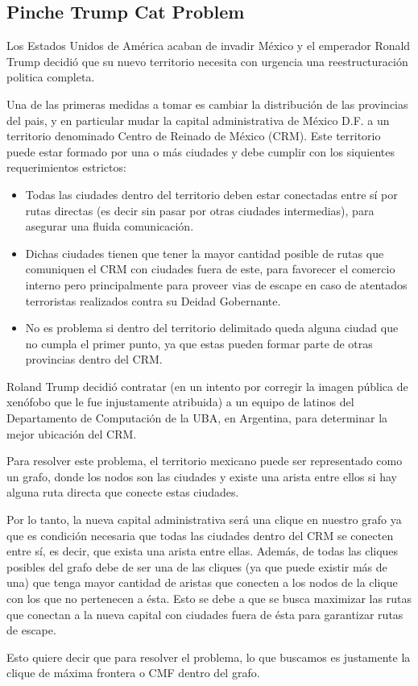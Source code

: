 \subsection{Pinche Trump Cat Problem}
Los Estados Unidos de América acaban de invadir México y el emperador Ronald Trump decidió que su nuevo territorio necesita con urgencia una reestructuración politica completa. 

Una de las primeras medidas a tomar es cambiar la distribución de las provincias del pais, y en particular mudar la capital administrativa de México D.F. a un territorio denominado Centro de Reinado de México (CRM). Este territorio puede estar formado por una o más ciudades y debe cumplir con los siquientes requerimientos estrictos:

\begin{itemize}
\item Todas las ciudades dentro del territorio deben estar conectadas entre sí por rutas directas (es decir sin pasar por otras ciudades intermedias), para asegurar una fluida comunicación.
\item Dichas ciudades tienen que tener la mayor cantidad posible de rutas que comuniquen el CRM con ciudades fuera de este, para favorecer el comercio interno pero principalmente para proveer vias de escape en caso de atentados terroristas realizados contra su Deidad Gobernante.
\item No es problema si dentro del territorio delimitado queda alguna ciudad que no cumpla el primer punto, ya que estas pueden formar parte de otras provincias dentro del CRM.
\end{itemize}

Roland Trump decidió contratar (en un intento por corregir la imagen pública de xenófobo que le fue injustamente atribuida) a un equipo de latinos del Departamento de Computación de la UBA, en Argentina, para determinar la mejor ubicación del CRM.

Para resolver este problema, el territorio mexicano puede ser representado como un grafo, donde los nodos son las ciudades y existe una arista entre ellos si hay alguna ruta directa que conecte estas ciudades.

Por lo tanto, la nueva capital administrativa será una clique en nuestro grafo ya que es condición necesaria que todas las ciudades dentro del CRM se conecten entre sí, es decir, que exista una arista entre ellas. Además, de todas las cliques posibles del grafo debe de ser una de las cliques (ya que puede existir más de una) que tenga mayor cantidad de aristas que conecten a los nodos de la clique con los que no pertenecen a ésta. Esto se debe a que se busca maximizar las rutas que conectan a la nueva capital con ciudades fuera de ésta para garantizar rutas de escape.

Esto quiere decir que para resolver el problema, lo que buscamos es justamente la clique de máxima frontera o CMF dentro del grafo.